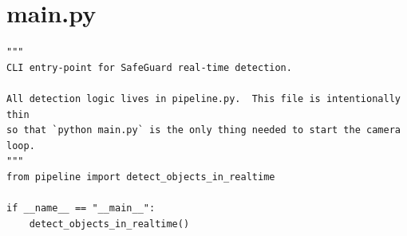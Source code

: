 \documentclass[12pt,a4paper]{report}
\begin{document}
\section{main.py}
\begin{lstlisting}
"""
CLI entry-point for SafeGuard real-time detection.

All detection logic lives in pipeline.py.  This file is intentionally thin
so that `python main.py` is the only thing needed to start the camera loop.
"""
from pipeline import detect_objects_in_realtime

if __name__ == "__main__":
    detect_objects_in_realtime()
\end{lstlisting}

\end{document}
